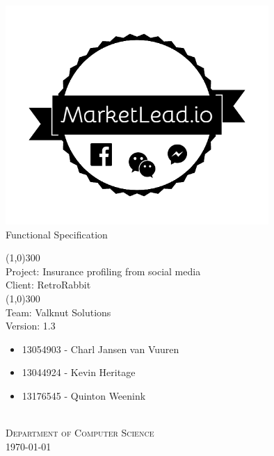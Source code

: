 \documentclass{article}
\begin{document}
	\begin{titlepage}
		\begin{center}
			\includegraphics[width=10cm]{images/marketlead_3.png}  \\
			[0.5cm]
			\huge{
			Functional Specification\\
			}

			\line(1,0){300}\\
			[0.2cm]
			\LARGE{Project: Insurance profiling from social media\\
			Client: RetroRabbit} \\
			\line(1,0){300}\\
			\LARGE{Team: Valknut Solutions}\\
			[1.0cm]
			\large{Version: 1.3}\\
			\large
			{
			\begin{itemize}
				\item 13054903 - Charl Jansen van Vuuren
				\item 13044924 - Kevin Heritage
				\item 13176545 - Quinton Weenink\\
			\end{itemize}
			}
			\textsc{\large}\\
		[1.0cm]
		\textsc{\large  Department of Computer Science}\\
		[0.5cm]
		\textsc{\large \today}\\
		\end{center}


	\end{titlepage}
\end{document}
